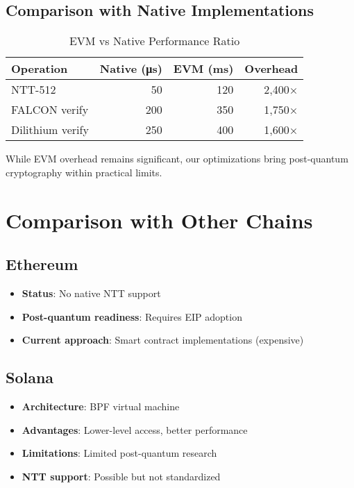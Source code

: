 \documentclass[11pt,a4paper]{article}
\begin{document}
\subsection{Comparison with Native Implementations}

\begin{table}[h]
\centering
\caption{EVM vs Native Performance Ratio}
\begin{tabular}{lrrr}
\toprule
Operation & Native (μs) & EVM (ms) & Overhead \\
\midrule
NTT-512 & 50 & 120 & 2,400× \\
FALCON verify & 200 & 350 & 1,750× \\
Dilithium verify & 250 & 400 & 1,600× \\
\bottomrule
\end{tabular}
\end{table}

While EVM overhead remains significant, our optimizations bring post-quantum cryptography within practical limits.

\section{Comparison with Other Chains}

\subsection{Ethereum}

\begin{itemize}
\item \textbf{Status}: No native NTT support
\item \textbf{Post-quantum readiness}: Requires EIP adoption
\item \textbf{Current approach}: Smart contract implementations (expensive)
\end{itemize}

\subsection{Solana}

\begin{itemize}
\item \textbf{Architecture}: BPF virtual machine
\item \textbf{Advantages}: Lower-level access, better performance
\item \textbf{Limitations}: Limited post-quantum research
\item \textbf{NTT support}: Possible but not standardized
\end{itemize}
\end{document}
